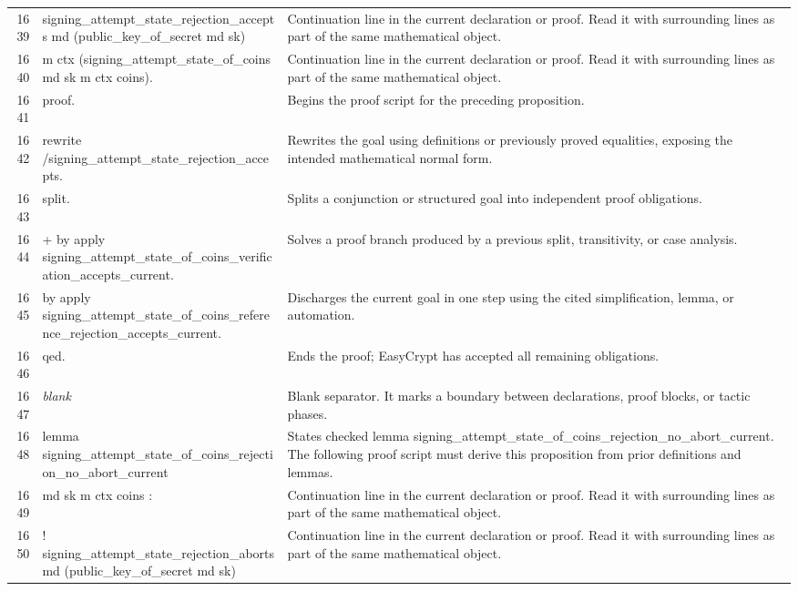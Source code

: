 \documentclass[10pt]{article}
\begin{document}
\begin{longtable}{r L{0.53\textwidth} L{0.37\textwidth}}
1639 & {\ttfamily\scriptsize   signing\_attempt\_state\_rejection\_accepts md (public\_key\_of\_secret md sk)} & Continuation line in the current declaration or proof.  Read it with surrounding lines as part of the same mathematical object. \\
1640 & {\ttfamily\scriptsize     m ctx (signing\_attempt\_state\_of\_coins md sk m ctx coins).} & Continuation line in the current declaration or proof.  Read it with surrounding lines as part of the same mathematical object. \\
1641 & {\ttfamily\scriptsize proof.} & Begins the proof script for the preceding proposition. \\
1642 & {\ttfamily\scriptsize rewrite /signing\_attempt\_state\_rejection\_accepts.} & Rewrites the goal using definitions or previously proved equalities, exposing the intended mathematical normal form. \\
1643 & {\ttfamily\scriptsize split.} & Splits a conjunction or structured goal into independent proof obligations. \\
1644 & {\ttfamily\scriptsize + by apply signing\_attempt\_state\_of\_coins\_verification\_accepts\_current.} & Solves a proof branch produced by a previous split, transitivity, or case analysis. \\
1645 & {\ttfamily\scriptsize by apply signing\_attempt\_state\_of\_coins\_reference\_rejection\_accepts\_current.} & Discharges the current goal in one step using the cited simplification, lemma, or automation. \\
1646 & {\ttfamily\scriptsize qed.} & Ends the proof; EasyCrypt has accepted all remaining obligations. \\
1647 & {\ttfamily\scriptsize \emph{blank}} & Blank separator.  It marks a boundary between declarations, proof blocks, or tactic phases. \\
1648 & {\ttfamily\scriptsize lemma signing\_attempt\_state\_of\_coins\_rejection\_no\_abort\_current} & States checked lemma signing\_attempt\_state\_of\_coins\_rejection\_no\_abort\_current.  The following proof script must derive this proposition from prior definitions and lemmas. \\
1649 & {\ttfamily\scriptsize    md sk m ctx coins :} & Continuation line in the current declaration or proof.  Read it with surrounding lines as part of the same mathematical object. \\
1650 & {\ttfamily\scriptsize   ! signing\_attempt\_state\_rejection\_aborts md (public\_key\_of\_secret md sk)} & Continuation line in the current declaration or proof.  Read it with surrounding lines as part of the same mathematical object. \\

\end{longtable}
\end{document}
